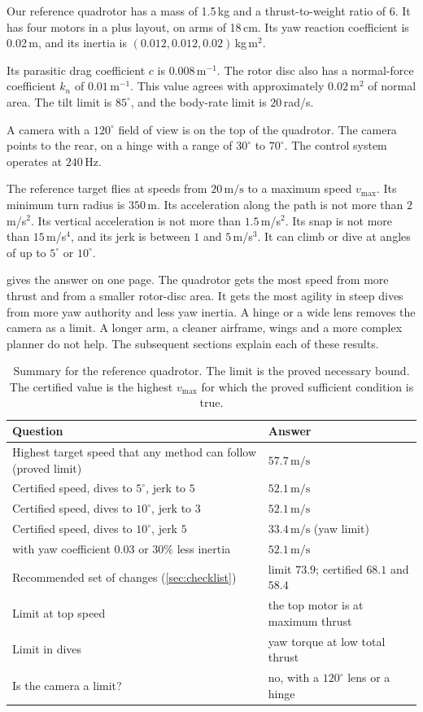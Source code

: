 \documentclass[11pt]{article}
\newcommand{\ms}{\,\mathrm{m/s}}
\begin{document}
Our reference quadrotor has a mass of 1.5\,kg and a thrust-to-weight ratio of 6.
It has four motors in a plus layout, on arms of 18\,cm.
Its yaw reaction coefficient is 0.02\,m, and its inertia is $(0.012, 0.012, 0.02)$\,kg\,m$^2$.

Its parasitic drag coefficient $c$ is $0.008\,\mathrm{m}^{-1}$.
The rotor disc also has a normal-force coefficient $k_n$ of $0.01\,\mathrm{m}^{-1}$.
This value agrees with approximately $0.02$\,m$^2$ of normal area.
The tilt limit is $85^\circ$, and the body-rate limit is $20$\,rad/s.

A camera with a $120^\circ$ field of view is on the top of the quadrotor.
The camera points to the rear, on a hinge with a range of $30^\circ$ to $70^\circ$.
The control system operates at $240$\,Hz.

The reference target flies at speeds from $20\ms$ to a maximum speed $v_{\max}$.
Its minimum turn radius is $350$\,m.
Its acceleration along the path is not more than $2$\,m/s$^2$.
Its vertical acceleration is not more than $1.5$\,m/s$^2$.
Its snap is not more than $15$\,m/s$^4$, and its jerk is between $1$ and $5$\,m/s$^3$.
It can climb or dive at angles of up to $5^\circ$ or $10^\circ$.

 gives the answer on one page.
The quadrotor gets the most speed from more thrust and from a smaller rotor-disc area.
It gets the most agility in steep dives from more yaw authority and less yaw inertia.
A hinge or a wide lens removes the camera as a limit.
A longer arm, a cleaner airframe, wings and a more complex planner do not help.
The subsequent sections explain each of these results.

\begin{table}[t]
\centering
\caption{Summary for the reference quadrotor. The limit is the proved necessary bound. The
certified value is the highest $v_{\max}$ for which the proved sufficient condition is true.}
\label{tab:summary}
\begin{tabularx}{\linewidth}{@{}Yl@{}}
\toprule
Question & Answer \\
\midrule
Highest target speed that any method can follow (proved limit) & $57.7\ms$ \\
Certified speed, dives to $5^\circ$, jerk to $5$ & $52.1\ms$ \\
Certified speed, dives to $10^\circ$, jerk to $3$ & $52.1\ms$ \\
Certified speed, dives to $10^\circ$, jerk $5$ & $33.4\ms$ (yaw limit) \\
\quad with yaw coefficient $0.03$ or $30\%$ less inertia & $52.1\ms$ \\
Recommended set of changes (\cref{sec:checklist}) & limit $73.9$; certified $68.1$ and $58.4$ \\
Limit at top speed & the top motor is at maximum thrust \\
Limit in dives & yaw torque at low total thrust \\
Is the camera a limit? & no, with a $120^\circ$ lens or a hinge \\
\bottomrule
\end{tabularx}
\end{table}
\end{document}

